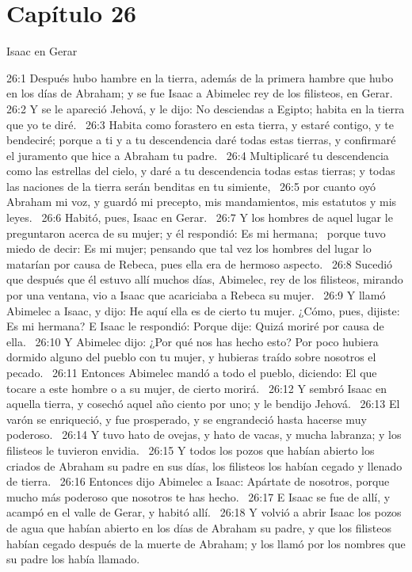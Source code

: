 \section*{Capítulo 26 }
Isaac en Gerar  

26:1 Después hubo hambre en la tierra, además de la primera hambre que hubo en los días de Abraham; y se fue Isaac a Abimelec rey de los filisteos, en Gerar.  
26:2 Y se le apareció Jehová, y le dijo: No desciendas a Egipto; habita en la tierra que yo te diré.  
26:3 Habita como forastero en esta tierra, y estaré contigo, y te bendeciré; porque a ti y a tu descendencia daré todas estas tierras, y confirmaré el juramento que hice a Abraham tu padre.  
26:4 Multiplicaré tu descendencia como las estrellas del cielo, y daré a tu descendencia todas estas tierras; y todas las naciones de la tierra serán benditas en tu simiente,  
26:5 por cuanto oyó Abraham mi voz, y guardó mi precepto, mis mandamientos, mis estatutos y mis leyes.  
26:6 Habitó, pues, Isaac en Gerar.  
26:7 Y los hombres de aquel lugar le preguntaron acerca de su mujer; y él respondió: Es mi hermana;  porque tuvo miedo de decir: Es mi mujer; pensando que tal vez los hombres del lugar lo matarían por causa de Rebeca, pues ella era de hermoso aspecto.  
26:8 Sucedió que después que él estuvo allí muchos días, Abimelec, rey de los filisteos, mirando por una ventana, vio a Isaac que acariciaba a Rebeca su mujer.  
26:9 Y llamó Abimelec a Isaac, y dijo: He aquí ella es de cierto tu mujer. ¿Cómo, pues, dijiste: Es mi hermana? E Isaac le respondió: Porque dije: Quizá moriré por causa de ella.  
26:10 Y Abimelec dijo: ¿Por qué nos has hecho esto? Por poco hubiera dormido alguno del pueblo con tu mujer, y hubieras traído sobre nosotros el pecado.  
26:11 Entonces Abimelec mandó a todo el pueblo, diciendo: El que tocare a este hombre o a su mujer, de cierto morirá.  
26:12 Y sembró Isaac en aquella tierra, y cosechó aquel año ciento por uno; y le bendijo Jehová.  
26:13 El varón se enriqueció, y fue prosperado, y se engrandeció hasta hacerse muy poderoso.  
26:14 Y tuvo hato de ovejas, y hato de vacas, y mucha labranza; y los filisteos le tuvieron envidia.  
26:15 Y todos los pozos que habían abierto los criados de Abraham su padre en sus días, los filisteos los habían cegado y llenado de tierra.  
26:16 Entonces dijo Abimelec a Isaac: Apártate de nosotros, porque mucho más poderoso que nosotros te has hecho.  
26:17 E Isaac se fue de allí, y acampó en el valle de Gerar, y habitó allí.  
26:18 Y volvió a abrir Isaac los pozos de agua que habían abierto en los días de Abraham su padre, y que los filisteos habían cegado después de la muerte de Abraham; y los llamó por los nombres que su padre los había llamado.  
